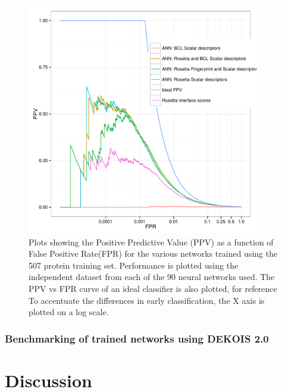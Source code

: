 \begin{figure}
\centering
\includegraphics[width=4in]{figures/hts/ppv_plot.pdf}
\caption{
Plots showing the Positive Predictive Value (PPV) as a function of False Positive Rate(FPR) for the various networks trained using the 507 protein training set.
Performance is plotted using the independent dataset from each of the 90 neural networks used.
The PPV vs FPR curve of an ideal classifier is also plotted, for reference
To accentuate the differences in early classification, the X axis is plotted on a log scale.
}
\label{fig:ppv_plot}
\end{figure}

\subsubsection{Benchmarking of trained networks using DEKOIS 2.0}


\section{Discussion}